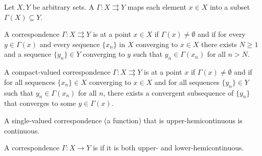 \documentclass[10pt]{article}
\begin{document}
\begin{definition}
	Let $X,Y$ be arbitrary sets. A  $\Gamma: X \rightrightarrows Y$ maps each element $x \in X$ into a subset $\Gamma(X) \subseteq Y$.
\end{definition}
\begin{definition}
	A correspondence $\Gamma: X \rightrightarrows Y$ is  at a point $x \in X$ if $\Gamma(x) \ne \emptyset$ and if for every $y \in \Gamma(x)$ and every sequence $\{x_n\}$ in $X$ converging to $x \in X$ there exists $N \ge 1$ and a sequence $\{y_n\} \in Y$ converging to $y$ such that $y_n \in \Gamma(x_n)$ for all $n > N$. 
\end{definition}
\begin{definition}
	A compact-valued correspondence $\Gamma: X \rightrightarrows Y$ is  at a point $x$ if $\Gamma(x) \ne \emptyset$ and if for all sequences $\{x_n\} \in X$ converging to $x \in X$ and for all sequences $\{y_n\} \in Y$ such that $y_n \in \Gamma(x_n)$ for all $n$, there exists a convergent subsequence of $\{y_n\}$ that converges to some $y \in \Gamma(x)$.  
\end{definition}
\begin{remark}
	A single-valued correspondence (\ie a function) that is upper-hemicontinuous is continuous.
\end{remark}
\begin{definition}
	A correspondence $\Gamma : X \to Y$ is  if it is both upper- and lower-hemicontinuous.
\end{definition}
\end{document}
